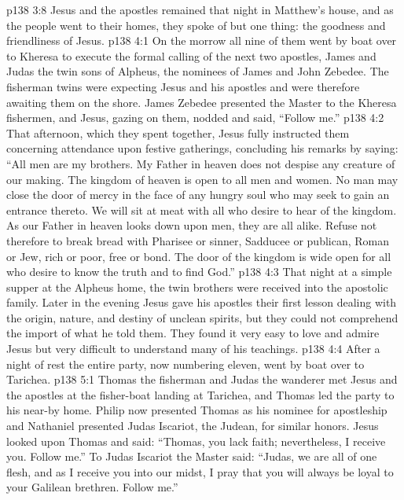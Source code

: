 \vs p138 3:8 Jesus and the apostles remained that night in Matthew’s house, and as the people went to their homes, they spoke of but one thing: the goodness and friendliness of Jesus.
\vs p138 4:1 On the morrow all nine of them went by boat over to Kheresa to execute the formal calling of the next two apostles, James and Judas the twin sons of Alpheus, the nominees of James and John Zebedee. The fisherman twins were expecting Jesus and his apostles and were therefore awaiting them on the shore. James Zebedee presented the Master to the Kheresa fishermen, and Jesus, gazing on them, nodded and said, \textcolor{ubdarkred}{“Follow me.”}
\pc \vs p138 4:2 That afternoon, which they spent together, Jesus fully instructed them concerning attendance upon festive gatherings, concluding his remarks by saying: \textcolor{ubdarkred}{“All men are my brothers. My Father in heaven does not despise any creature of our making. The kingdom of heaven is open to all men and women. No man may close the door of mercy in the face of any hungry soul who may seek to gain an entrance thereto. We will sit at meat with all who desire to hear of the kingdom. As our Father in heaven looks down upon men, they are all alike. Refuse not therefore to break bread with Pharisee or sinner, Sadducee or publican, Roman or Jew, rich or poor, free or bond. The door of the kingdom is wide open for all who desire to know the truth and to find God.”}
\pc \vs p138 4:3 That night at a simple supper at the Alpheus home, the twin brothers were received into the apostolic family. Later in the evening Jesus gave his apostles their first lesson dealing with the origin, nature, and destiny of unclean spirits, but they could not comprehend the import of what he told them. They found it very easy to love and admire Jesus but very difficult to understand many of his teachings.\plusone
\vs p138 4:4 After a night of rest the entire party, now numbering eleven, went by boat over to Tarichea.
\vs p138 5:1 Thomas the fisherman and Judas the wanderer met Jesus and the apostles at the fisher\hyp{}boat landing at Tarichea, and Thomas led the party to his near\hyp{}by home. Philip now presented Thomas as his nominee for apostleship and Nathaniel presented Judas Iscariot, the Judean, for similar honors. Jesus looked upon Thomas and said: \textcolor{ubdarkred}{“Thomas, you lack faith; nevertheless, I receive you. Follow me.”} To Judas Iscariot the Master said: \textcolor{ubdarkred}{“Judas, we are all of one flesh, and as I receive you into our midst, I pray that you will always be loyal to your Galilean brethren. Follow me.”}
